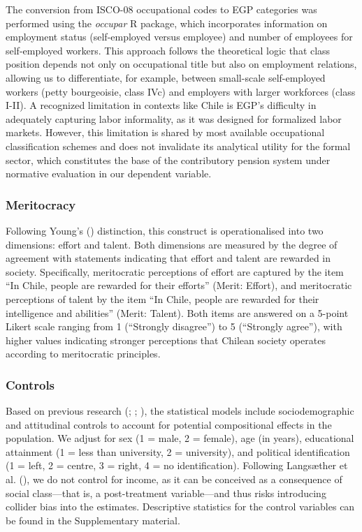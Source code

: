 \documentclass[
  12pt,
]{article}
\begin{document}
The conversion from ISCO-08 occupational codes to EGP categories was
performed using the \emph{occupar} R package, which incorporates
information on employment status (self-employed versus employee) and
number of employees for self-employed workers. This approach follows the
theoretical logic that class position depends not only on occupational
title but also on employment relations, allowing us to differentiate,
for example, between small-scale self-employed workers (petty
bourgeoisie, class IVc) and employers with larger workforces (class
I-II). A recognized limitation in contexts like Chile is EGP's
difficulty in adequately capturing labor informality, as it was designed
for formalized labor markets. However, this limitation is shared by most
available occupational classification schemes and does not invalidate
its analytical utility for the formal sector, which constitutes the base
of the contributory pension system under normative evaluation in our
dependent variable.

\subsubsection{Meritocracy}\label{meritocracy-1}

Following Young's () distinction,
this construct is operationalised into two dimensions: effort and
talent. Both dimensions are measured by the degree of agreement with
statements indicating that effort and talent are rewarded in society.
Specifically, meritocratic perceptions of effort are captured by the
item ``In Chile, people are rewarded for their efforts'' (Merit:
Effort), and meritocratic perceptions of talent by the item ``In Chile,
people are rewarded for their intelligence and abilities'' (Merit:
Talent). Both items are answered on a 5-point Likert scale ranging from
1 (``Strongly disagree'') to 5 (``Strongly agree''), with higher values
indicating stronger perceptions that Chilean society operates according
to meritocratic principles.

\subsubsection{Controls}\label{controls}

Based on previous research
(; ;
), the statistical models
include sociodemographic and attitudinal controls to account for
potential compositional effects in the population. We adjust for sex (1
= male, 2 = female), age (in years), educational attainment (1 = less
than university, 2 = university), and political identification (1 =
left, 2 = centre, 3 = right, 4 = no identification). Following
Langsæther et al. (), we
do not control for income, as it can be conceived as a consequence of
social class---that is, a post-treatment variable---and thus risks
introducing collider bias into the estimates. Descriptive statistics for
the control variables can be found in the Supplementary material.
\end{document}
